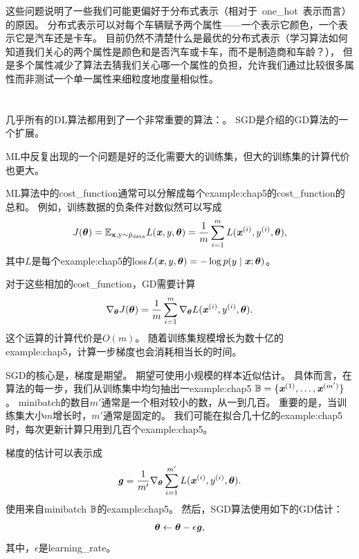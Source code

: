 
这些问题说明了一些我们可能更偏好于分布式表示（相对于~\gls{one_hot}~表示而言）的原因。
分布式表示可以对每个车辆赋予两个属性——一个表示它颜色，一个表示它是汽车还是卡车。
目前仍然不清楚什么是最优的分布式表示（学习算法如何知道我们关心的两个属性是颜色和是否汽车或卡车，而不是制造商和车龄？），
但是多个属性减少了算法去猜我们关心哪一个属性的负担，允许我们通过比较很多属性而非测试一个单一属性来细粒度地度量相似性。

\section{}
\label{sec:stochastic_gradient_descent_chap5}
几乎所有的\gls{DL}算法都用到了一个非常重要的算法：。
\gls{SGD}是介绍的\gls{GD}算法的一个扩展。

\gls{ML}中反复出现的一个问题是好的泛化需要大的训练集，但大的训练集的计算代价也更大。


\gls{ML}算法中的\gls{cost_function}通常可以分解成每个\gls{example:chap5}的\gls{cost_function}的总和。
例如，训练数据的负条件对数似然可以写成
\begin{equation}
    J(\boldsymbol{\theta}) = \mathbb{E}_{\mathbf{x},\mathrm{y} \sim \hat{p}_{\text{data}}}
    L(\boldsymbol{\mathit{x}}, y, \boldsymbol{\theta}) = 
    \frac{1}{m} \sum_{i=1}^m  L(\boldsymbol{\mathit{x}}^{(i)}, y^{(i)}, \boldsymbol{\theta}) ,
\end{equation}
其中$L$是每个\gls{example:chap5}的\gls{loss}$L(\boldsymbol{\mathit{x}}, y, \boldsymbol{\theta}) = -\log p(y\mid\boldsymbol{\mathit{x}};\boldsymbol{\theta})$。

对于这些相加的\gls{cost_function}，\gls{GD}需要计算
\begin{equation}
    \nabla_{\boldsymbol{\theta}} J(\boldsymbol{\theta})
    = \frac{1}{m} \sum_{i=1}^m  
    \nabla_{\boldsymbol{\theta}} L(\boldsymbol{\mathit{x}}^{(i)}, y^{(i)}, \boldsymbol{\theta}) .
\end{equation}
这个运算的计算代价是$O(m)$。
随着训练集规模增长为数十亿的\gls{example:chap5}，计算一步梯度也会消耗相当长的时间。

\gls{SGD}的核心是，梯度是期望。
期望可使用小规模的样本近似估计。
具体而言，在算法的每一步，我们从训练集中均匀抽出一\gls{example:chap5} $\mathbb{B}=\{\boldsymbol{\mathit{x}}^{(1)},\dots,\boldsymbol{\mathit{x}}^{(m')}\}$。
\gls{minibatch}的数目$m'$通常是一个相对较小的数，从一到几百。
重要的是，当训练集大小$m$增长时，$m'$通常是固定的。
我们可能在拟合几十亿的\gls{example:chap5}时，每次更新计算只用到几百个\gls{example:chap5}。

梯度的估计可以表示成
\begin{equation}
    \boldsymbol{\mathit{g}} = \frac{1}{m'} \nabla_{\boldsymbol{\theta}} \sum_{i=1}^{m'}
    L(\boldsymbol{\mathit{x}}^{(i)}, y^{(i)}, \boldsymbol{\theta}).
\end{equation}
使用来自\gls{minibatch} $\mathbb{B}$的\gls{example:chap5}。
然后，\gls{SGD}算法使用如下的\gls{GD}估计：
\begin{equation}
    \boldsymbol{\theta} \leftarrow \boldsymbol{\theta} - \epsilon \boldsymbol{\mathit{g}},
\end{equation}
其中，$\epsilon$是\gls{learning_rate}。

